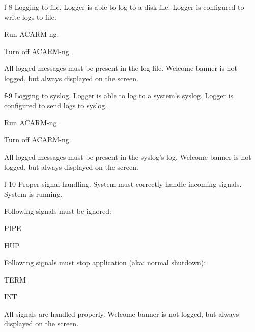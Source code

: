 \testCase
{f-8}
{Logging to file.}
{Logger is able to log to a disk file.}
{Logger is configured to write logs to file.}
{
\begin{enumerate*}
\item Run ACARM-ng.
\item Turn off ACARM-ng.
\end{enumerate*}
}
{All logged messages must be present in the log file.}
{Welcome banner is not logged, but always displayed on the screen.}


\testCase
{f-9}
{Logging to syslog.}
{Logger is able to log to a system's syslog.}
{Logger is configured to send logs to syslog.}
{
\begin{enumerate*}
\item Run ACARM-ng.
\item Turn off ACARM-ng.
\end{enumerate*}
}
{All logged messages must be present in the syslog's log.}
{Welcome banner is not logged, but always displayed on the screen.}


\testCase
{f-10}
{Proper signal handling.}
{System must correctly handle incoming signals.}
{System is running.}
{
Following signals must be ignored:
\begin{enumerate*}
\item PIPE
\item HUP
\end{enumerate*}
Following signals must stop application (aka: normal shutdown):
\begin{enumerate*}
\item TERM
\item INT
\end{enumerate*}
}
{All signals are handled properly.}
{Welcome banner is not logged, but always displayed on the screen.}
